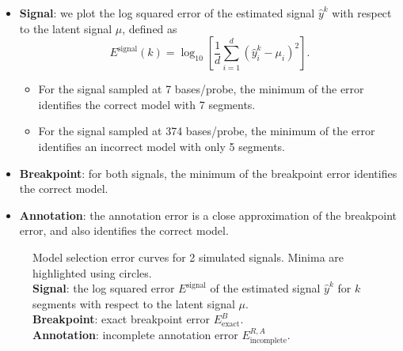 \documentclass{jsfds} %
\begin{document}
\begin{itemize}
\item \textbf{Signal}: we plot the log squared error of the estimated
  signal $\hat y^k$ with respect to the latent signal $\mu$, defined
  as
  \begin{equation}
    \label{eq:signal_cost}
    E^{\text{signal}}(k) = \log_{10}\left[
\frac 1 d \sum_{i=1}^d(\hat y_i^k - \mu_i)^2
\right].
  \end{equation}
  \begin{itemize}
\item For the signal sampled at 7 bases/probe, the minimum of the
  error identifies the correct model with 7 segments.
\item For the signal sampled at 374 bases/probe, the minimum of the
  error identifies an incorrect model with only 5
  segments.
  \end{itemize}
\item \textbf{Breakpoint}: for both signals, the minimum of the
  breakpoint error identifies the correct model. 
\item \textbf{Annotation}: the annotation error is a close
  approximation of the breakpoint error, and also identifies the
  correct model.
\end{itemize}
\begin{figure}[H]
  \centering
  
  \caption{Model selection error curves for 2 simulated
    signals. Minima are highlighted using circles.
    \protect\\
    \textbf{Signal}: the log squared error $E^{\text{signal}}$ of the
    estimated signal $\hat y^k$ for $k$ segments with respect to the
    latent signal $\mu$.
    \protect\\
    \textbf{Breakpoint}: exact breakpoint error $E^B_{\text{exact}}$.
    \protect\\
    \textbf{Annotation}: incomplete annotation error
    $E^{R,A}_{\text{incomplete}}$.
}
  \label{fig:variable-density-sigerr-small}
\end{figure}

\newpage
\end{document}
